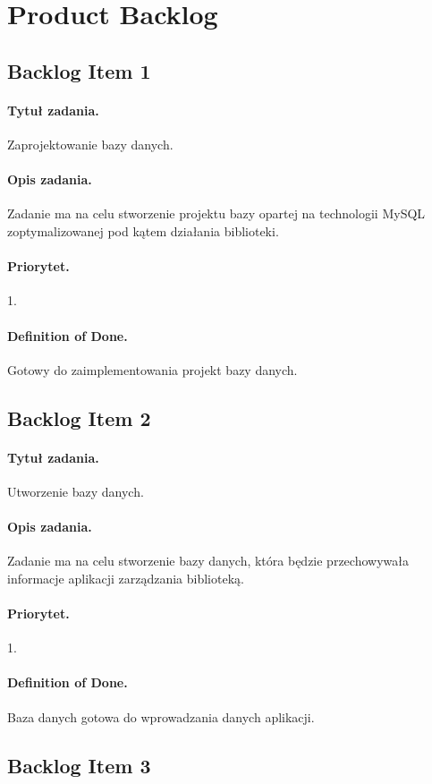 \documentclass[a4paper]{article}
\begin{document}
\section{Product Backlog}

\subsection{Backlog Item 1}
\paragraph{Tytuł zadania.} Zaprojektowanie bazy danych.
\paragraph{Opis zadania.} Zadanie ma na celu stworzenie projektu bazy opartej na technologii MySQL zoptymalizowanej pod kątem działania biblioteki.
\paragraph{Priorytet.} 1.
\paragraph{Definition of Done.} Gotowy do zaimplementowania projekt bazy danych.

\subsection{Backlog Item 2}
\paragraph{Tytuł zadania.} Utworzenie bazy danych.
\paragraph{Opis zadania.} Zadanie ma na celu stworzenie bazy danych, która będzie przechowywała informacje aplikacji zarządzania biblioteką.
\paragraph{Priorytet.} 1.
\paragraph{Definition of Done.} Baza danych gotowa do wprowadzania danych aplikacji.

\subsection{Backlog Item 3}
\end{document}
